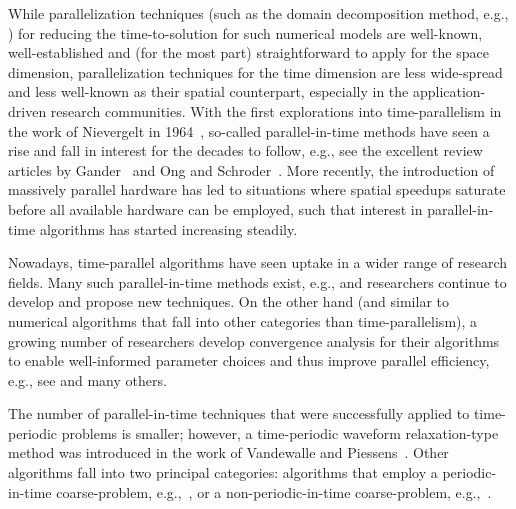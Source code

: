 \documentclass[3p]{elsarticle}
\begin{document}
While parallelization techniques (such as the domain decomposition method,
e.g., \cite{Roache1978,Roache1995,QuarteroniValli1999})
for reducing the time-to-solution for such numerical models
are well-known,
well-established and (for the most part) straightforward to apply for the space dimension,
parallelization techniques for the time dimension are less wide-spread
and less well-known as their spatial counterpart, especially in the application-driven research communities.
With the first explorations into time-parallelism in the work of Nievergelt in 1964~\cite{Nievergelt1964},
so-called parallel-in-time methods have seen a rise and fall in interest for the decades to follow,
e.g., see the excellent review articles by Gander~\cite{Gander2015}
and Ong and Schroder~\cite{OngSchroder2020}.
More recently, the introduction of massively parallel hardware
has led to situations where spatial speedups saturate before all available hardware can be employed,
such that interest in parallel-in-time algorithms has started increasing steadily.

Nowadays, time-parallel algorithms have seen uptake in a wider range of research fields.
Many such parallel-in-time methods exist, e.g.,
\cite{LubichOstermann1987,VandewalleVandevelde1994,HortonVandewalle1995,
FarhatChandesris2003,FarhatCortialDastillungBavestrello2006,
ChristliebMacdonaldOng2010,SpeckRuprechtKrauseEmmettMinionWinkelGibbon2012,
EmmettMinion2012,HamonSchreiberMinion2019,LionsMadayTurinici2001,
FriedhoffFalgoutKolevMaclachlanSchroder2012,FalgoutFriedhoffKolevMaclachlanSchroder2014}
and researchers continue to develop and propose new techniques.
On the other hand (and similar to numerical algorithms that fall into other categories than time-parallelism),
a growing number of researchers develop convergence analysis for their algorithms
to enable well-informed parameter choices and thus improve parallel efficiency,
e.g., see \cite{GanderJiangSongZhang2013,BenedusiHuppArbenzKrause2016,
FriedhoffMaclachlan2015,FriedhoffSouthworth2019_preprint,KrzysikDesterkMaclachlanFriedhoff2019,DesterckFriedhoffHowseMaclachlan2019,
DobrevKolevPeterssonSchroder2017,Southworth2019,HessenthalerSouthworthNordslettenRoehrleFalgoutSchroder2020,
GanderLunet2020,SouthworthMitchellHessenthalerDanieli} and many others.

The number of parallel-in-time techniques that were successfully applied to time-periodic
problems is smaller; however,
a time-periodic waveform relaxation-type method was introduced
in the work of Vandewalle and Piessens~\cite{VandewallePiessens1992}.
Other algorithms fall into two principal categories:
algorithms that employ a periodic-in-time
coarse-problem, e.g.,~\cite{BenedusiHuppArbenzKrause2016,GanderKulchytskaruchkaSchoeps2018,
ChristopherFalgoutSchroderGuzikGao2020,ChristopherGaoGuzikFalgoutSchroder2020},
or a non-periodic-in-time
coarse-problem, e.g.,~\cite{SongJiang2014,GanderKulchytskaruchkaSchoeps2018,GanderKulchytskaruchkaSchoeps2020}.
\end{document}
